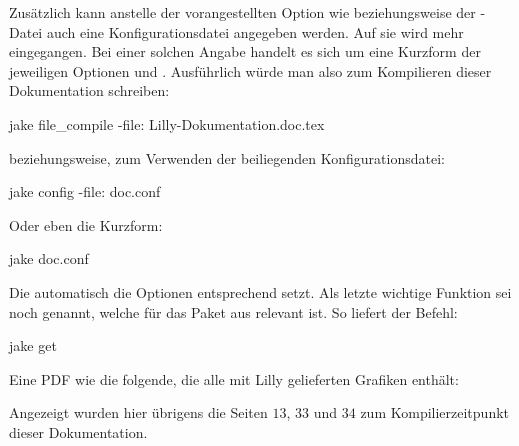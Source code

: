 Zusätzlich kann anstelle der vorangestellten Option wie  beziehungsweise der -Datei auch eine Konfigurationsdatei angegeben werden. Auf sie wird  %
mehr eingegangen. Bei einer solchen Angabe handelt es sich um eine Kurzform der jeweiligen Optionen  und . Ausführlich würde man also zum Kompilieren dieser Dokumentation schreiben:
\begin{bash*}
jake file_compile -file: Lilly-Dokumentation.doc.tex
\end{bash*}
beziehungsweise, zum Verwenden der beiliegenden Konfigurationsdatei:
\begin{bash*}
jake config -file: doc.conf
\end{bash*}
Oder eben die Kurzform:
\begin{bash*}
jake doc.conf
\end{bash*}
Die automatisch die Optionen entsprechend setzt.\smallskip\newline
Als letzte wichtige Funktion sei noch  genannt, welche für das Paket  aus  relevant ist. So liefert der Befehl:
\begin{bash*}
jake get
\end{bash*}
Eine PDF wie die folgende, die alle mit Lilly gelieferten Grafiken enthält:
\begin{tcbraster}[raster columns=3, blankest, graphics pages={13,33,34},colback=white]
\end{tcbraster}
Angezeigt wurden hier übrigens die Seiten $13$, $33$ und $34$ zum Kompilierzeitpunkt dieser Dokumentation.
